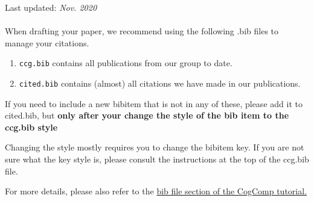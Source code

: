 \documentclass[11pt,a4paper]{article}
\begin{document}
Last updated: \textit{Nov. 2020}\\\\
When drafting your paper, we recommend using the following .bib files to manage your citations. 
\begin{enumerate}
    \item \texttt{ccg.bib} contains all publications from our group to date.
    \item \texttt{cited.bib} contains (almost) all citations we have made in our publications. 
\end{enumerate}

If you need to include a new bibitem that is not in any of these, please add it to cited.bib, but {\bf only after your change the style of the bib item to the ccg.bib style}

Changing the style mostly requires you to change the bibitem key. If you are not sure what the key style is, please consult the instructions at the top of the ccg.bib file.


For more details, please also refer to the \href{ https://docs.google.com/document/d/1I33aIJXMzIIaZQDHZzdpDEink5fKztU_VKFlbj-KzhA/edit#heading=h.k9gb5efodg4w}{\color{blue} bib file section of the CogComp tutorial. } \\
\end{document}
